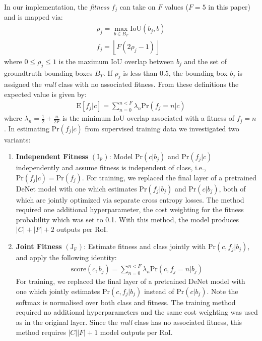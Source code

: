 \documentclass[10pt,twocolumn,letterpaper]{article}
\begin{document}
In our implementation, the \textit{fitness} $f_j$ can take on $F$ values ($F=5$ in this paper) and is mapped via:
\begin{gather}
\rho_j = \max_{b \in B_T} \mathrm{IoU}(b_j, b) \\
f_j = \left \lfloor F (2 \rho_j - 1) \right \rfloor
\end{gather}
where $0 \leq \rho_j \leq 1$ is the maximum IoU overlap between $b_j$ and the set of groundtruth bounding boxes $B_T$. If $\rho_j$ is less than 0.5, the bounding box $b_j$ is assigned the \textit{null} class with no associated fitness. From these definitions the expected value is given by:
\begin{gather}
\mathrm{E} \left [ f_j | c \right] = \sum^{n < F}_{n=0} \lambda_n \mathrm{Pr}(f_j=n|c)
\end{gather}
where $\lambda_n = \frac{1}{2} + \frac{n}{2F}$ is the minimum IoU overlap associated with a fitness of $f_j=n$. In estimating $\mathrm{Pr}(f_j|c)$ from supervised training data we investigated two variants:
\begin{enumerate}[label=(\alph*)]
\item \textbf{Independent Fitness} $\left(\bm{\mathrm{I_F}} \right)$: Model $\mathrm{Pr}(c|b_j)$ and $\mathrm{Pr}(f_j|c)$ independently and assume fitness is independent of class, i.e., $\mathrm{Pr}(f_j|c) = \mathrm{Pr}(f_j)$. For training, we replaced the final layer of a pretrained DeNet model with one which estimates $\mathrm{Pr}(f_j|b_j)$ and $\mathrm{Pr}(c|b_j)$, both of which are jointly optimized via separate cross entropy losses. The method required one additional hyperparameter, the cost weighting for the fitness probability which was set to 0.1. With this method, the model produces $|C|+|F|+2$ outputs per RoI. 
\item \textbf{Joint Fitness} $\left(\bm{\mathrm{J_F}} \right)$: Estimate fitness and class jointly with $\mathrm{Pr}(c,f_j|b_j)$, and apply the following identity:
\begin{gather}
\mathrm{score}(c, b_j) = \sum^{n<F}_{n=0} \lambda_n \mathrm{Pr}(c, f_j=n | b_j)
\end{gather}
For training, we replaced the final layer of a pretrained DeNet model with one which jointly estimates $\mathrm{Pr}(c,f_j|b_j)$ instead of $\mathrm{Pr}(c|b_j)$. Note the softmax is normalised over both class and fitness. The training method required no additional hyperparameters and the same cost weighting was used as in the original layer. Since the \textit{null} class has no associated fitness, this method requires $|C||F| + 1$ model outputs per RoI. 
\end{enumerate}
\end{document}
